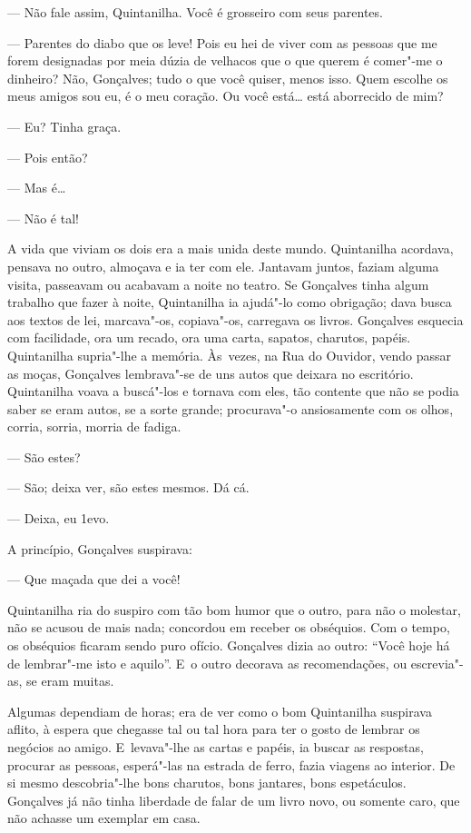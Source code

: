 \begin{linenumbers}
--- Não fale assim, Quintanilha. Você é grosseiro com seus parentes.

--- Parentes do diabo que os leve! Pois eu hei de viver com as pessoas
que me forem designadas por meia dúzia de velhacos que o que querem é
comer"-me o dinheiro? Não, Gonçalves; tudo o que você quiser, menos isso.
Quem escolhe os meus amigos sou eu, é o meu coração. Ou você está\ldots{}
está aborrecido de mim?

--- Eu? Tinha graça.

--- Pois então?

--- Mas é\ldots{}

--- Não é tal!

A vida que viviam os dois era a mais unida deste mundo. Quintanilha
acordava, pensava no outro, almoçava e ia ter com ele. Jantavam juntos,
faziam alguma visita, passeavam ou acabavam a noite no teatro. Se
Gonçalves tinha algum trabalho que fazer à noite, Quintanilha ia
ajudá"-lo como obrigação; dava busca aos textos de lei, marcava"-os,
copiava"-os, carregava os livros. Gonçalves esquecia com facilidade, ora
um recado, ora uma carta, sapatos, charutos, papéis. Quintanilha
supria"-lhe a memória. Às~vezes, na Rua do Ouvidor, vendo passar as
moças, Gonçalves lembrava"-se de uns autos que deixara no escritório.
Quintanilha voava a buscá"-los e tornava com eles, tão contente que não
se podia saber se eram autos, se a sorte grande; procurava"-o
ansiosamente com os olhos, corria, sorria, morria de fadiga.

--- São estes?

--- São; deixa ver, são estes mesmos. Dá cá.

--- Deixa, eu 1evo.

A princípio, Gonçalves suspirava:

--- Que maçada que dei a você!

Quintanilha ria do suspiro com tão bom humor que o outro, para não o
molestar, não se acusou de mais nada; concordou em receber os obséquios.
Com o tempo, os obséquios ficaram sendo puro ofício. Gonçalves dizia ao
outro: ``Você hoje há de lembrar"-me isto e aquilo''. E~o outro decorava
as recomendações, ou escrevia"-as, se eram muitas.

Algumas dependiam de horas; era de ver como o bom Quintanilha suspirava
aflito, à espera que chegasse tal ou tal hora para ter o gosto de
lembrar os negócios ao amigo. E~levava"-lhe as cartas e papéis, ia buscar
as respostas, procurar as pessoas, esperá"-las na estrada de ferro, fazia
viagens ao interior. De si mesmo descobria"-lhe bons charutos, bons
jantares, bons espetáculos. Gonçalves já não tinha liberdade de falar de
um livro novo, ou somente caro, que não achasse um exemplar em casa.


\end{linenumbers}
